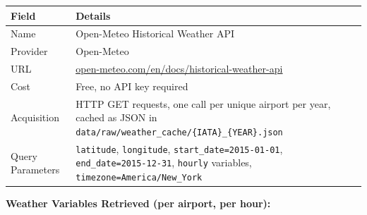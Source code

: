 \documentclass{article}
\newcommand{\code}[1]{\texttt{\small #1}}
\begin{document}
\begin{tcolorbox}[mainbox, title={API Overview}]
\renewcommand{\arraystretch}{1.4}
\begin{tabularx}{\textwidth}{L{3.2cm} X}
    \toprule
    \textbf{Field} & \textbf{Details} \\
    \midrule
    Name               & Open-Meteo Historical Weather API \\
    Provider           & Open-Meteo \\
    URL                & \href{https://open-meteo.com/en/docs/historical-weather-api}{\textcolor{accentblue}{\underline{open-meteo.com/en/docs/historical-weather-api}}} \\
    Cost               & Free, no API key required \\
    Acquisition        & HTTP GET requests, one call per unique airport per year, cached as JSON in \code{data/raw/weather\_cache/\{IATA\}\_\{YEAR\}.json} \\
    Query Parameters   & \code{latitude}, \code{longitude}, \code{start\_date=2015-01-01}, \code{end\_date=2015-12-31}, \code{hourly} variables, \code{timezone=America/New\_York} \\
    \bottomrule
\end{tabularx}
\end{tcolorbox}

\vspace{0.5em}
\textbf{Weather Variables Retrieved (per airport, per hour):}
\end{document}
